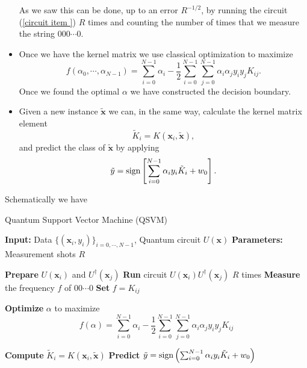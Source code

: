 \documentclass[a4paper]{article}
\begin{document}
\begin{itemize}
    As we saw this can be done, up to an error $R^{-1/2}$, by running the circuit (\ref{circuit item }) $R$ times and counting the number of times that we measure the string $000\cdots 0$.
    \item Once we have the kernel matrix we use classical optimization to maximize
    \begin{equation}
        f(\alpha_0,\cdots,\alpha_{N-1})=\sum_{i=0}^{N-1} \alpha_i-\frac{1}{2}\sum_{i=0}^{N-1}\sum_{j=0}^{N-1}\alpha_i\alpha_jy_iy_jK_{ij}.
    \end{equation}
    Once we found the optimal $\alpha$ we have constructed the decision boundary.
    \item Given a new instance $\tilde{\mathbf{x}}$ we can, in the same way, calculate the kernel matrix element $$\tilde{K}_i=K(\mathbf{x}_i, \tilde{\mathbf{x}}),$$ and predict the class of $\tilde{\mathbf{x}}$ by applying \begin{equation}
        \tilde{y}=\textup{sign}\left[\sum_{i=0}^{N-1}\alpha_iy_i\tilde{K}_i+w_0\right].
    \end{equation}
\end{itemize}

Schematically we have 

\begin{algorithm}[H]
    \caption{Quantum Support Vector Machine (QSVM)}
    \begin{algorithmic}[1]
        \State \textbf{Input:} Data $\{(\mathbf{x}_i, y_i)\}_{i=0,\cdots,N-1}$, Quantum circuit $U(\mathbf{x})$
        \State \textbf{Parameters:} Measurement shots $R$
        
                \State \textbf{Prepare} $U(\mathbf{x}_i)$ and $U^\dagger(\mathbf{x}_j)$
                \State \textbf{Run} circuit $U(\mathbf{x}_i)U^\dagger(\mathbf{x}_j)$ $R$ times  
                \State \textbf{Measure} the frequency $f$ of $00\cdots 0$ 
                \State \textbf{Set} $f=K_{ij}$ 
            \EndFor
        \EndFor
        
        \State \textbf{Optimize} $\alpha$ to maximize
        \begin{equation*}
            f(\alpha) = \sum_{i=0}^{N-1} \alpha_i - \frac{1}{2} \sum_{i=0}^{N-1} \sum_{j=0}^{N-1} \alpha_i \alpha_j y_i y_j K_{ij}
        \end{equation*}
    
            \State \textbf{Compute} $\tilde{K}_i = K(\mathbf{x}_i, \tilde{\mathbf{x}})$
            \State \textbf{Predict} $\tilde{y} = \textup{sign}\left(\sum_{i=0}^{N-1} \alpha_i y_i \tilde{K}_i + w_0\right)$
        \EndFor
        
    \end{algorithmic}
    \end{algorithm}
\end{document}
